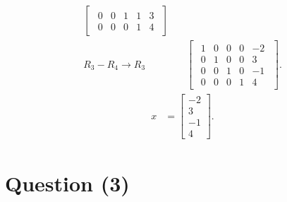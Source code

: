 \documentclass{zc-ust-hw}
\begin{document}
\begin{enumerate}[label=\roman*.]
\begin{align}
\begin{bmatrix}
\begin{array}{cccc|c}
          0 & 0 & 1 & 1 & 3  \\
          0 & 0 & 0 & 1 & 4
        \end{array}
      \end{bmatrix} \\
      R_3 - R_4 \rightarrow R_3
      &\quad
      \begin{bmatrix} 
        \begin{array}{cccc|c}
          1 & 0 & 0 & 0 & -2 \\
          0 & 1 & 0 & 0 & 3  \\
          0 & 0 & 1 & 0 & -1 \\
          0 & 0 & 0 & 1 & 4
        \end{array}
      \end{bmatrix}
    .\end{align}
    \begin{align}
      x &=
      \begin{bmatrix} 
        -2 \\ 3 \\ -1 \\ 4
      \end{bmatrix}
    .\end{align}
\end{enumerate}

\newpage

\section*{Question (3)}
\end{document}
